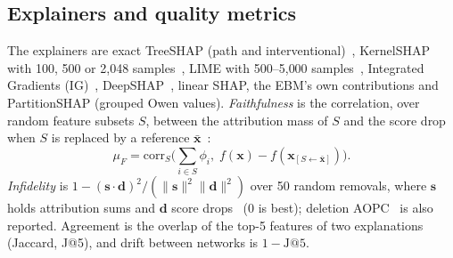 \documentclass[pdflatex,iicol,sn-mathphys-num]{sn-jnl}
\begin{document}
\subsection{Explainers and quality metrics}
The explainers are exact TreeSHAP (path and interventional)~\cite{lundberg2020}, KernelSHAP with 100, 500 or 2{,}048 samples~\cite{lundberg2017}, LIME with 500--5{,}000 samples~\cite{ribeiro2016}, Integrated Gradients (IG)~\cite{sundararajan2017}, DeepSHAP~\cite{shrikumar2017}, linear SHAP, the EBM's own contributions and PartitionSHAP (grouped Owen values). \emph{Faithfulness} is the correlation, over random feature subsets $S$, between the attribution mass of $S$ and the score drop when $S$ is replaced by a reference $\bar{\mathbf{x}}$~\cite{bhatt2020}:
\begin{equation}
\mu_F=\mathrm{corr}_{S}\big(\textstyle\sum_{i\in S}\phi_i,\; f(\mathbf{x})-f(\mathbf{x}_{[S\leftarrow\bar{\mathbf{x}}]})\big).\label{eq:faith}
\end{equation}
\emph{Infidelity} is $1-(\mathbf{s}\cdot\mathbf{d})^2/(\|\mathbf{s}\|^2\|\mathbf{d}\|^2)$ over 50 random removals, where $\mathbf{s}$ holds attribution sums and $\mathbf{d}$ score drops~\cite{yeh2019} (0 is best); deletion AOPC~\cite{samek2017} is also reported. Agreement is the overlap of the top-5 features of two explanations (Jaccard, J@5), and drift between networks is $1-\mathrm{J@5}$.
\end{document}
